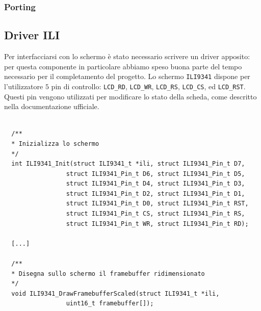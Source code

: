 \documentclass[hidelinks,12pt]{article}
\begin{document}
\subsubsection{Porting}
%
%
%

\subsection{Driver ILI}
Per interfacciarsi con lo schermo è stato necessario scrivere un driver
apposito: per questa componente in particolare abbiamo speso buona parte del
tempo necessario per il completamento del progetto. Lo schermo \texttt{ILI9341}
dispone per l'utilizzatore $5$ pin di controllo: \texttt{LCD\_RD},
\texttt{LCD\_WR}, \texttt{LCD\_RS}, \texttt{LCD\_CS}, ed \texttt{LCD\_RST}.
Questi pin vengono utilizzati per modificare lo stato della scheda, come
descritto nella documentazione ufficiale.
\begin{table}[h]
	\begin{verbatim}

  /**
  * Inizializza lo schermo
  */
  int ILI9341_Init(struct ILI9341_t *ili, struct ILI9341_Pin_t D7,
                 struct ILI9341_Pin_t D6, struct ILI9341_Pin_t D5,
                 struct ILI9341_Pin_t D4, struct ILI9341_Pin_t D3,
                 struct ILI9341_Pin_t D2, struct ILI9341_Pin_t D1,
                 struct ILI9341_Pin_t D0, struct ILI9341_Pin_t RST,
                 struct ILI9341_Pin_t CS, struct ILI9341_Pin_t RS,
                 struct ILI9341_Pin_t WR, struct ILI9341_Pin_t RD);

  [...]

  /**
  * Disegna sullo schermo il framebuffer ridimensionato
  */
  void ILI9341_DrawFramebufferScaled(struct ILI9341_t *ili, 
                 uint16_t framebuffer[]);
  \end{verbatim}
	\caption{}
	\label{table:driver_ili}
\end{table}
\end{document}
